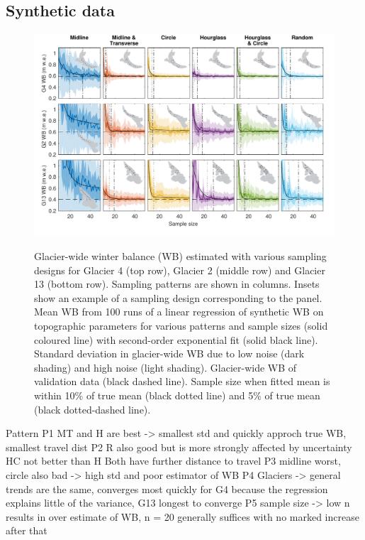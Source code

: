 \documentclass[twocolumn,letterpaper]{igs}
\begin{document}
\subsection{Synthetic data}
\begin{figure}
	\centering
	\includegraphics[width =\textwidth]{SyntheticObsWB.pdf}\\
	\caption{Glacier-wide winter balance (WB) estimated with various sampling designs for Glacier 4 (top row), Glacier 2 (middle row) and Glacier 13 (bottom row). Sampling patterns are shown in columns. Insets show an example of a sampling design corresponding to the panel. Mean WB from 100 runs of a linear regression of synthetic WB on topographic parameters for various patterns and sample sizes (solid coloured line) with second-order exponential fit (solid black line). Standard deviation in glacier-wide WB due to low noise (dark shading) and high noise (light shading). Glacier-wide WB of validation data (black dashed line). Sample size when fitted mean is within 10\% of true mean (black dotted line) and 5\% of true mean (black dotted-dashed line).}
	\label{fig:SyntheticObsWB}
\end{figure}

Pattern
P1 MT and H are best -> smallest std and quickly approch true WB, smallest travel dist
P2 R also good but is more strongly affected by uncertainty
     HC not better than H
     Both have further distance to travel
P3 midline worst, circle also bad -> high std and poor estimator of WB
P4 Glaciers -> general trends are the same, converges most quickly for G4 because the regression explains little of the variance, G13 longest to converge
P5 sample size -> low n results in over estimate of WB, n = 20 generally suffices with no marked increase after that
\end{document}
